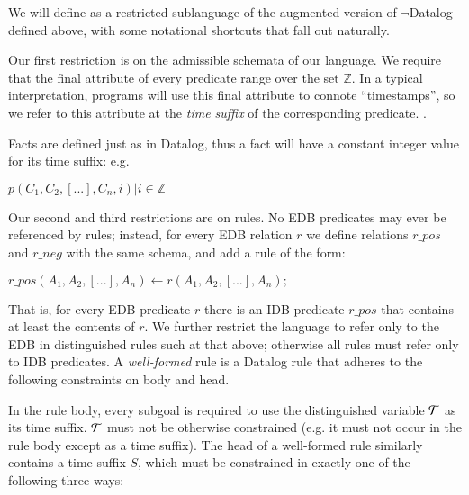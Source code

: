 We will define \dedalus as a restricted sublanguage of the augmented version of $\lnot$Datalog defined above, with some notational shortcuts that fall out naturally.

Our first restriction is on the admissible schemata of our language. We  require that the final attribute of every \dedalus predicate range over the set $\mathbb{Z}$.  In a typical interpretation, \dedalus programs will use this final attribute to connote ``timestamps'', so we refer to this attribute at the \emph{time suffix} of the corresponding predicate.  .    

Facts are defined just as in Datalog, thus a fact
will have a constant integer value for its time suffix: e.g.


$p(C_{1},C_{2},[...],C_{n}, i) |  i \in \mathbb{Z}$

Our second and third restrictions are on rules.  
No EDB predicates may ever be referenced by rules; instead, for every EDB relation $r$ we define relations $r\_pos$ 
and $r\_neg$ with the same schema, and add a rule of the form:

$r\_pos(A_1, A_2, [...], A_n) \leftarrow r(A_1, A_2, [...], A_n);$

That is, for every EDB predicate
$r$ there is an IDB predicate $r\_pos$ that contains at least the contents of $r$.  We further restrict the
language to refer only to the EDB in distinguished rules such at that above; otherwise all rules must refer 
only to IDB predicates.
A {\em well-formed }\dedalus rule is a Datalog rule that adheres to the following constraints on body and head.  

In the rule body, every
subgoal is required to use the distinguished variable $\Tau$ as its time suffix.  
$\Tau$ must not be otherwise
constrained (e.g. it must not occur in the rule body except as a time suffix).
The head of a well-formed rule similarly contains a time suffix $S$, which must
be constrained in exactly one of the following three ways:

